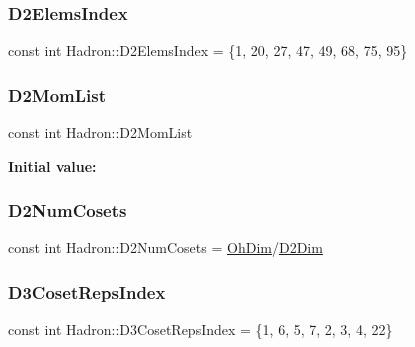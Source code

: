\subsubsection{\texorpdfstring{D2ElemsIndex}{D2ElemsIndex}}
{\footnotesize\ttfamily const int Hadron\+::\+D2\+Elems\+Index = \{1, 20, 27, 47, 49, 68, 75, 95\}}

\mbox{\label{namespaceHadron_abcf1382c26424df96bdeef91a583d542}} 
\subsubsection{\texorpdfstring{D2MomList}{D2MomList}}
{\footnotesize\ttfamily const int Hadron\+::\+D2\+Mom\+List}

{\bfseries Initial value\+:}
\begin{DoxyCode}{0}

\end{DoxyCode}
\mbox{\label{namespaceHadron_a4e182e6efe3c7594360137b45836d532}} 
\subsubsection{\texorpdfstring{D2NumCosets}{D2NumCosets}}
{\footnotesize\ttfamily const int Hadron\+::\+D2\+Num\+Cosets = \mbox{\hyperlink{namespaceHadron_a2bea98b7ecd13619ef78b6d204d59707}{Oh\+Dim}}/\mbox{\hyperlink{namespaceHadron_af071977674047009b141391b4256dc12}{D2\+Dim}}}

\mbox{\label{namespaceHadron_a9bef0e0898639097c24679733aa4d9ac}} 
\subsubsection{\texorpdfstring{D3CosetRepsIndex}{D3CosetRepsIndex}}
{\footnotesize\ttfamily const int Hadron\+::\+D3\+Coset\+Reps\+Index = \{1, 6, 5, 7, 2, 3, 4, 22\}}

